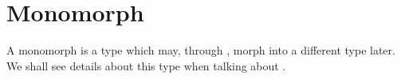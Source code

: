 \section{Monomorph}
\label{types-monomorph}

A monomorph is a type which may, through , morph into a different type later. We shall see details about this type when talking about .
